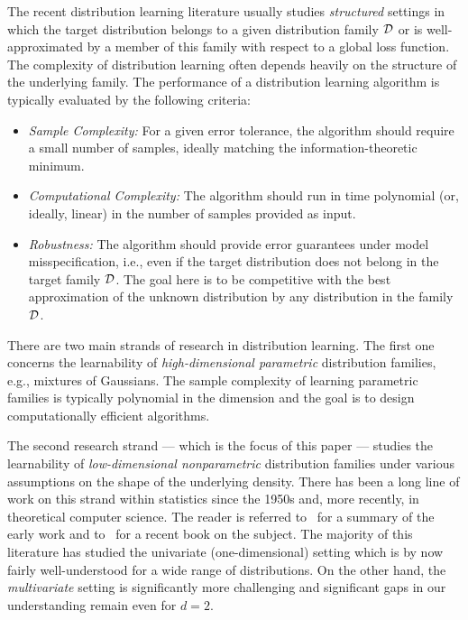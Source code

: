 \documentclass[final,12pt]{colt2018} %
\begin{document}
The recent distribution learning literature usually studies \emph{structured} settings 
in which the target distribution belongs to a given distribution family ${\cal D}$ 
or is well-approximated by a member of this family with respect to a global loss function.
The complexity of distribution learning often depends heavily on the structure of the underlying family.
The performance of a distribution learning algorithm is typically evaluated by the following criteria:
\begin{itemize}
\item {\em Sample Complexity:} For a given error tolerance, the algorithm should require a small number of samples,
ideally matching the information-theoretic minimum.
\item {\em Computational Complexity:}  The algorithm should run in time polynomial (or, ideally, linear)
in the number of samples provided as input.

\item {\em Robustness:} The algorithm should provide error guarantees under model misspecification,
i.e., even if the target distribution does not belong in the target family ${\cal D}$.
The goal here is to be competitive with the best approximation of the unknown distribution
by any distribution in the family ${\cal D}$.
\end{itemize}

There are two main strands of research in distribution learning.
The first one concerns the learnability of {\em high-dimensional parametric} 
distribution families, e.g., mixtures of Gaussians. The sample complexity of learning parametric families
is typically polynomial in the dimension and the goal is to design computationally efficient algorithms.

The second research strand --- which is the focus of this paper ---
studies the learnability of {\em low-dimensional nonparametric} distribution families under various
assumptions on the shape of the underlying density. There has been a long line of work on this strand
within statistics since the 1950s and, more recently, in theoretical computer science. 
The reader is referred to~\cite{BBBB:72} for a summary of the early work and to~\cite{GJ:14} 
for a recent book on the subject. 
The majority of this literature has studied the univariate (one-dimensional) setting which is by now fairly well-understood
for a wide range of distributions. On the other hand, the {\em multivariate} setting is significantly more challenging and significant gaps in our understanding remain even for $d=2$.
\end{document}
